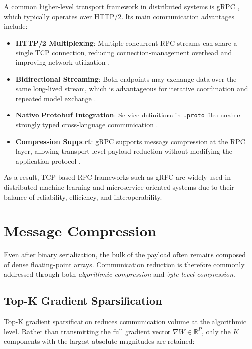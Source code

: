 A common higher-level transport framework in distributed systems is gRPC
\cite{grpc2016whitepaper}, which typically operates over HTTP/2. Its main
communication advantages include:

\begin{itemize}
    \item \textbf{HTTP/2 Multiplexing}: Multiple concurrent RPC streams can share a
    single TCP connection, reducing connection-management overhead and improving
    network utilization \cite{rfc7540, rfc9113}.

    \item \textbf{Bidirectional Streaming}: Both endpoints may exchange data over the
    same long-lived stream, which is advantageous for iterative coordination and
    repeated model exchange \cite{grpc2016whitepaper}.

    \item \textbf{Native Protobuf Integration}: Service definitions in \texttt{.proto}
    files enable strongly typed cross-language communication \cite{protobuf_overview, 
    grpc2016whitepaper}.

    \item \textbf{Compression Support}: gRPC supports message compression at the RPC
    layer, allowing transport-level payload reduction without modifying the application
    protocol \cite{grpc2016whitepaper}.
\end{itemize}

As a result, TCP-based RPC frameworks such as gRPC are widely used in distributed
machine learning and microservice-oriented systems due to their balance of reliability,
efficiency, and interoperability.

\section{Message Compression}
\label{sec:compression}

Even after binary serialization, the bulk of the payload often remains composed of
dense floating-point arrays. Communication reduction is therefore commonly addressed 
through both \emph{algorithmic compression} and \emph{byte-level compression}.

\subsection{Top-K Gradient Sparsification}
\label{subsec:compression_topk}

Top-K gradient sparsification \cite{aji2017sparse} reduces communication volume at the
algorithmic level. Rather than transmitting the full gradient vector
$\nabla W \in \mathbb{R}^P$, only the $K$ components with the largest absolute
magnitudes are retained:

